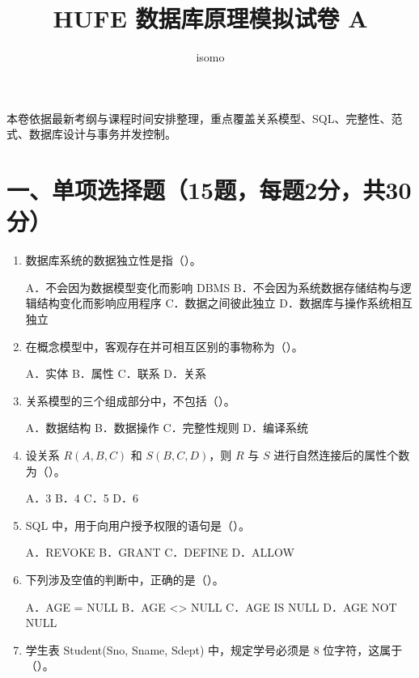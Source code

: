 \documentclass{../../note}
\title{HUFE 数据库原理模拟试卷 A}
\author{isomo}
\begin{document}
\fontsize{12pt}{14.4pt}\selectfont
\maketitle

本卷依据最新考纲与课程时间安排整理，重点覆盖关系模型、SQL、完整性、范式、数据库设计与事务并发控制。

\section*{一、单项选择题（15题，每题2分，共30分）}

\begin{enumerate}[itemsep=0.8em]
\item 数据库系统的数据独立性是指（\hspace{0.8cm}）。

A．不会因为数据模型变化而影响 DBMS
\quad B．不会因为系统数据存储结构与逻辑结构变化而影响应用程序
\quad C．数据之间彼此独立
\quad D．数据库与操作系统相互独立

\item 在概念模型中，客观存在并可相互区别的事物称为（\hspace{0.8cm}）。

A．实体 \quad B．属性 \quad C．联系 \quad D．关系

\item 关系模型的三个组成部分中，不包括（\hspace{0.8cm}）。

A．数据结构 \quad B．数据操作 \quad C．完整性规则 \quad D．编译系统

\item 设关系 $R(A,B,C)$ 和 $S(B,C,D)$，则 $R$ 与 $S$ 进行自然连接后的属性个数为（\hspace{0.8cm}）。

A．3 \quad B．4 \quad C．5 \quad D．6

\item SQL 中，用于向用户授予权限的语句是（\hspace{0.8cm}）。

A．REVOKE \quad B．GRANT \quad C．DEFINE \quad D．ALLOW

\item 下列涉及空值的判断中，正确的是（\hspace{0.8cm}）。

A．AGE = NULL \quad B．AGE <> NULL \quad C．AGE IS NULL \quad D．AGE NOT NULL

\item 学生表 Student(Sno, Sname, Sdept) 中，规定学号必须是 8 位字符，这属于（\hspace{0.8cm}）。


\end{enumerate}
\end{document}
